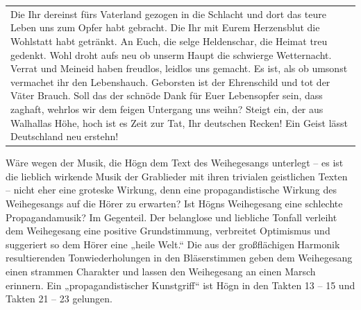 \begin{center}
\tablefirsthead{}
\tablehead{}
\tabletail{}
\tablelasttail{}
\begin{supertabular}{m{8.761001cm}}
Die Ihr dereinst fürs Vaterland gezogen in die Schlacht\newline
und dort das teure Leben uns zum Opfer habt gebracht.\newline
Die Ihr mit Eurem Herzensblut die Wohlstatt habt getränkt.\newline
An Euch, die selge Heldenschar, die Heimat treu gedenkt.\newline
\newline
Wohl droht aufs neu ob unserm Haupt die schwierge Wetternacht.\newline
Verrat und Meineid haben freudlos, leidlos uns gemacht.\newline
Es ist, als ob umsonst vermachet ihr den Lebenshauch.\newline
Geborsten ist der Ehrenschild und tot der Väter Brauch.\newline
\newline
Soll das der schnöde Dank für Euer Lebensopfer sein,\newline
dass zaghaft, wehrlos wir dem feigen Untergang uns weihn?\newline
Steigt ein, der aus Walhallas Höhe, hoch ist es Zeit zur Tat,\newline
Ihr deutschen Recken! Ein Geist lässt Deutschland neu erstehn!\\
\end{supertabular}
\end{center}
Wäre wegen der Musik, die Högn dem Text des Weihegesangs unterlegt – es
ist die lieblich wirkende Musik der Grablieder mit ihren trivialen
geistlichen Texten – nicht eher eine groteske Wirkung, denn eine
propagandistische Wirkung des Weihegesangs auf die Hörer zu erwarten?
Ist Högns Weihegesang eine schlechte Propagandamusik? Im Gegenteil. Der
belanglose und liebliche Tonfall verleiht dem Weihegesang eine positive
Grundstimmung, verbreitet Optimismus und suggeriert so dem Hörer eine
„heile Welt.“ Die aus der großflächigen Harmonik resultierenden
Tonwiederholungen in den Bläserstimmen geben dem Weihegesang einen
strammen Charakter und lassen den Weihegesang an einen Marsch erinnern.
Ein „propagandistischer Kunstgriff“ ist Högn in den Takten 13 – 15 und
Takten 21 – 23 gelungen.

